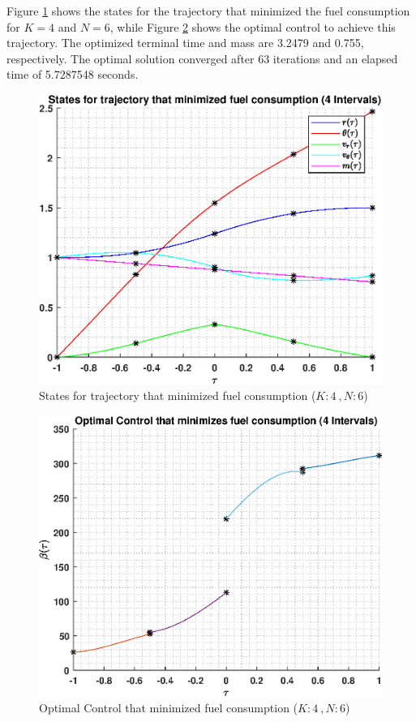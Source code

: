 \documentclass[]{article}
\begin{document}
\vspace{2mm}\newline 
Figure \ref{fig:directStatesK4Poly6} shows the states for the trajectory that minimized the fuel consumption for \(K = 4\) and  \(N = 6\), while Figure \ref{fig:directControlK4Poly6} shows the optimal control to achieve this trajectory. The optimized terminal time and mass are 3.2479 and 0.755, respectively. The optimal solution converged after 63 iterations and an elapsed time of 5.7287548 seconds.
\begin{figure}
	\centering
	\includegraphics[scale=0.75]{directStatesK4Poly6.eps}
	\caption{States for trajectory that minimized fuel consumption (\(K:4\ , N:6\))}
	\label{fig:directStatesK4Poly6}
\end{figure}
\begin{figure}
	\centering
	\includegraphics[scale=0.75]{directControlK4Poly6.eps}
	\caption{Optimal Control that minimized fuel consumption (\(K:4\ , N:6\))}
	\label{fig:directControlK4Poly6}
\end{figure}
\end{document}
